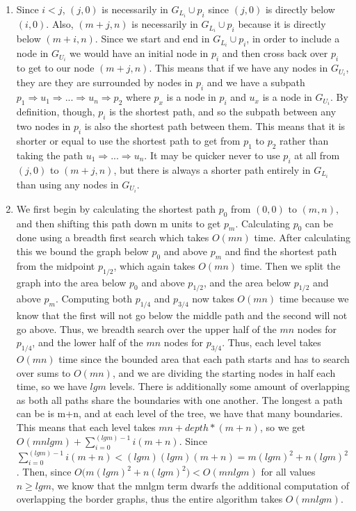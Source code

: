 \documentclass[12pt]{article}
\begin{document}
\begin{enumerate}[label=(\alph*)]
    \item Since $i < j$, $(j,0)$ is necessarily in $G_{L_i} \cup p_i$ since $(j,0)$ is directly below $(i,0)$. Also, $(m+j,n)$ is necessarily in $G_{L_i} \cup p_i$ because it is directly below $(m+i,n)$. Since we start and end in $G_{L_i} \cup p_i$, in order to include a node in $G_{U_i}$ we would have an initial node in $p_i$ and then cross back over $p_i$ to get to our node $(m+j,n)$. This means that if we have any nodes in $G_{U_i}$, they are they are surrounded by nodes in $p_i$ and we have a subpath $p_1 \Rightarrow u_1 \Rightarrow ... \Rightarrow u_n \Rightarrow p_2$ where $p_x$ is a node in $p_i$ and $u_x$ is a node in $ G_{U_i}$. By definition, though, $p_i$ is the shortest path, and so the subpath between any two nodes in $p_i$ is also the shortest path between them. This means that it is shorter or equal to use the shortest path to get from $p_1$ to $p_2$ rather than taking the path $u_1 \Rightarrow ... \Rightarrow u_n$. It may be quicker never to use $p_i$ at all from $(j,0)$ to $(m+j,n)$, but there is always a shorter path entirely in $G_{L_i}$ than using any nodes in $G_{U_i}$.

    \item We first begin by calculating the shortest path $p_0$ from $(0,0) \text{ to } (m,n)$, and then shifting this path down m units to get $p_m$. Calculating $p_0$ can be done using a breadth first search which takes $O(mn)$ time. After calculating this we bound the graph below $p_0$ and above $p_m$ and find the shortest path from the midpoint $p_{1/2}$, which again takes $O(mn)$ time. Then we split the graph into the area below $p_0$ and above $p_{1/2}$, and the area below $p_{1/2}$ and above $p_m$. Computing both $p_{1/4}$ and $p_{3/4}$ now takes $O(mn)$ time because we know that the first will not go below the middle path and the second will not go above. Thus, we breadth search over the upper half of the $mn$ nodes for $p_{1/4}$, and the lower half of the $mn$ nodes for $p_{3/4}$. Thus, each level takes $O(mn)$ time since the bounded area that each path starts and has to search over sums to $O(mn)$, and we are dividing the starting nodes in half each time, so we have $lgm$ levels. There is additionally some amount of overlapping as both all paths share the boundaries with one another. The longest a path can be is m+n, and at each level of the tree, we have that many boundaries. This means that each level takes $mn + depth*(m+n)$, so we get $O(mnlgm) + \sum\limits^{(lgm) -1}_{i = 0}i(m+n)$. Since $\sum\limits^{(lgm) -1}_{i = 0}i(m+n) < (lgm)(lgm)(m+n) = m(lgm)^2 + n(lgm)^2$. Then, since $O\big(m(lgm)^2 + n(lgm)^2\big) < O(mnlgm)$ for all values $n \ge lgm$, we know that the mnlgm term dwarfs the additional computation of overlapping the border graphs, thus the entire algorithm takes $O(mnlgm)$.
\end{enumerate}
\end{document}
